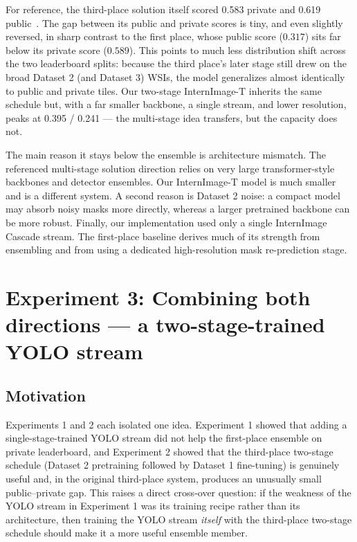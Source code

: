 \documentclass[12pt, a4paper]{article}
\begin{document}
For reference, the third-place solution itself scored 0.583 private and 0.619 public~\cite{nischay2023hubmapthird}. The gap between its public and private scores is tiny, and even slightly reversed, in sharp contrast to the first place, whose public score ($0.317$) sits far below its private score ($0.589$). This points to much less distribution shift across the two leaderboard splits: because the third place's later stage still drew on the broad Dataset 2 (and Dataset 3) WSIs, the model generalizes almost identically to public and private tiles. Our two-stage InternImage-T inherits the same schedule but, with a far smaller backbone, a single stream, and lower resolution, peaks at 0.395 / 0.241 --- the multi-stage idea transfers, but the capacity does not.

The main reason it stays below the ensemble is architecture mismatch. The referenced multi-stage solution direction relies on very large transformer-style backbones and detector ensembles. Our InternImage-T model is much smaller and is a different system. A second reason is Dataset 2 noise: a compact model may absorb noisy masks more directly, whereas a larger pretrained backbone can be more robust. Finally, our implementation used only a single InternImage Cascade stream. The first-place baseline derives much of its strength from ensembling and from using a dedicated high-resolution mask re-prediction stage.

\section{Experiment 3: Combining both directions --- a two-stage-trained YOLO stream}
\label{sec:combined}

\subsection{Motivation}

Experiments 1 and 2 each isolated one idea. Experiment 1 showed that adding a single-stage-trained YOLO stream did not help the first-place ensemble on private leaderboard, and Experiment 2 showed that the third-place two-stage schedule (Dataset 2 pretraining followed by Dataset 1 fine-tuning) is genuinely useful and, in the original third-place system, produces an unusually small public--private gap. This raises a direct cross-over question: if the weakness of the YOLO stream in Experiment 1 was its training recipe rather than its architecture, then training the YOLO stream \emph{itself} with the third-place two-stage schedule should make it a more useful ensemble member.
\end{document}
